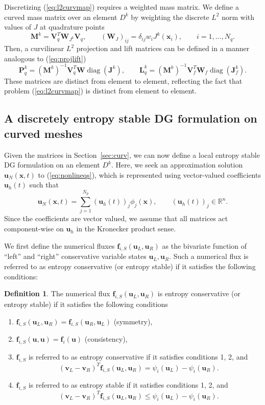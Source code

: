 \documentclass[preprint,10pt]{article}
\theoremstyle{definition}
\newtheorem{definition}{Definition}
\theoremstyle{lemma}
\theoremstyle{theorem}
\theoremstyle{assumption}
\DeclareMathOperator{\diag}{diag}
\newcommand{\LRp}[1]{\left( #1 \right)}
\begin{document}
{Discretizing (\ref{eq:l2curvmap}) requires a weighted mass matrix.  We define a curved mass matrix over an element $D^k$ by weighting the discrete $L^2$ norm with values of $J$ at quadrature points
\begin{equation}
\bm{M}^k = \bm{V}_q^T \bm{W}_{J^k} \bm{V}_q, \qquad \LRp{\bm{W}_J}_{ij} = \delta_{ij} w_i J^k(\bm{x}_i), \qquad i = 1,\ldots,N_q.
\label{eq:curvedmass}
\end{equation}
Then, a curvilinear $L^2$ projection and lift matrices can be defined in a manner analogous to (\ref{eq:projlift})
\begin{equation}
\bm{P}^k_q = \LRp{\bm{M}^k}^{-1}\bm{V}_q^T\bm{W}\diag\LRp{\bm{J}^k}, \qquad \bm{L}^k_q = \LRp{\bm{M}^k}^{-1}\bm{V}_f^T\bm{W}_f\diag\LRp{\bm{J}^k_f}.  
\label{eq:projliftcurved}
\end{equation}
These matrices are distinct from element to element, reflecting the fact that problem (\ref{eq:l2curvmap}) is distinct from element to element.  

\subsection{A discretely entropy stable DG formulation on curved meshes}

Given the matrices in Section~\ref{sec:curv}, we can now define a local entropy stable DG formulation on an element $D^k$.  Here, we seek an approximation solution $\bm{u}_N(\bm{x},t)$ to (\ref{eq:nonlineqs}), which is represented using vector-valued coefficients $\bm{u}_h(t)$ such that
\[
\bm{u}_N(\bm{x},t) = \sum_{j=1}^{N_p} \LRp{\bm{u}_h(t)}_j \phi_j(\bm{x}), \qquad \LRp{\bm{u}_h(t)}_j \in \mathbb{R}^n.
\]
Since the coefficients are vector valued, we assume that all matrices act component-wise on $\bm{u}_h$ in the Kronecker product sense.  

We first define the numerical fluxes $\bm{f}_{i,S}\LRp{\bm{u}_L,\bm{u}_R}$ as the bivariate function of ``left'' and ``right'' conservative variable states $\bm{u}_L, \bm{u}_R$.  Such a numerical flux is referred to as entropy conservative (or entropy stable) if it satisfies the following conditions:
\begin{definition}
The numerical flux $\bm{f}_{i,S}\LRp{\bm{u}_L,\bm{u}_R}$ is entropy conservative (or entropy stable) if it satisfies the following conditions
\begin{enumerate}
\item $\bm{f}_{i,S}\LRp{\bm{u}_L,\bm{u}_R} = \bm{f}_{i,S}\LRp{\bm{u}_R,\bm{u}_L}$ (symmetry),
\item $\bm{f}_{i,S}\LRp{\bm{u},\bm{u}} = \bm{f}_i\LRp{\bm{u}}$ (consistency),
\item $\bm{f}_{i,S}$ is referred to as entropy conservative if it satisfies conditions 1, 2, and  
\[
\LRp{\bm{v}_L-\bm{v}_R}^T\bm{f}_{i,S}\LRp{\bm{u}_L,\bm{u}_R} = \psi_i\LRp{\bm{u}_L}-\psi_i\LRp{\bm{u}_R}.
\]
\item $\bm{f}_{i,S}$ is referred to as entropy stable if it satisfies conditions 1, 2, and  
\[
\LRp{\bm{v}_L-\bm{v}_R}^T\bm{f}_{i,S}\LRp{\bm{u}_L,\bm{u}_R} \leq \psi_i\LRp{\bm{u}_L}-\psi_i\LRp{\bm{u}_R}.
\]
\end{enumerate}
\end{definition}

}
\end{document}
